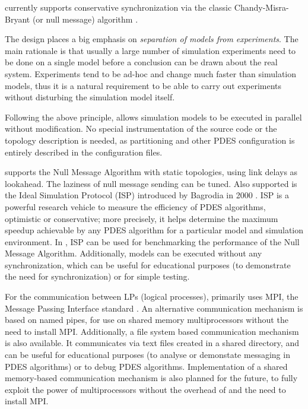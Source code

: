 {\opp} currently supports conservative synchronization
via the classic Chandy-Misra-Bryant (or null message) algorithm
\cite{chandymisra79}.

The {\opp} design places a big emphasis on
\textit{separation of models from experiments}. The main rationale
is that usually a large number of simulation experiments need to be done
on a single model before a conclusion can be drawn about the real system.
Experiments tend to be ad-hoc and change much faster than simulation
models, thus it is a natural requirement to be able to
carry out experiments without disturbing the simulation model itself.

Following the above principle, {\opp} allows simulation models
to be executed in parallel without modification. No special instrumentation
of the source code or the topology description is needed,
as partitioning and other PDES configuration is entirely described
in the configuration files.

{\opp} supports the Null Message Algorithm with static
topologies, using link delays as lookahead. The laziness of null message
sending can be tuned. Also supported is the Ideal Simulation Protocol
(ISP) introduced by Bagrodia in 2000 \cite{bagrodia00}. ISP is
a powerful research vehicle to measure the efficiency of
PDES algorithms, optimistic or conservative;
more precisely, it helps determine the maximum speedup achievable
by any PDES algorithm for a particular model and simulation environment.
In {\opp}, ISP can be used for benchmarking the performance of the
Null Message Algorithm.
Additionally, models can be executed without any synchronization, which
can be useful for educational purposes (to demonstrate the need for
synchronization) or for simple testing.

For the communication between LPs (logical processes), {\opp}
primarily uses MPI, the Message Passing Interface standard
\cite{mpiforum94}.  An alternative communication mechanism is based on
named pipes, for use on shared memory multiprocessors without the need
to install MPI.  Additionally, a file system based communication mechanism
is also available. It communicates via text files created in a shared
directory, and can be useful for educational purposes (to analyse or
demonstate messaging in PDES algorithms) or to debug PDES algorithms.
Implementation of a shared memory-based communication mechanism is also planned
for the future, to fully exploit the power of multiprocessors without
the overhead of and the need to install MPI.

